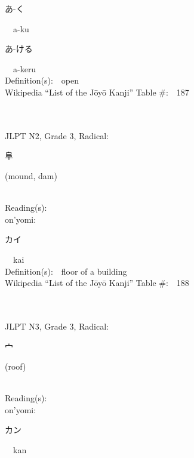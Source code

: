 \begin{multicols}{2}
{\hspace*{2em}}{\begin{CJK}{UTF8}{min} あ-く \end{CJK}}\ \ a-ku\ \ \\
{\hspace*{2em}}{\begin{CJK}{UTF8}{min} あ-ける \end{CJK}}\ \ a-keru\ \ \\
Definition(s):\ \ open \\
Wikipedia ``List of the J\=oy\=o Kanji'' Table \#:\ \ 187 \\
\ \ \\
{\fontsize{34pt}{40pt}  }\ \ \\  %
{JLPT N2, Grade 3, Radical:\ \ {\begin{CJK}{UTF8}{min} 阜 \end{CJK}} (mound, dam) } \\
Reading(s):\ \ \\
{\hspace*{1em}}on'yomi:\ \ \\
{\hspace*{2em}}{\begin{CJK}{UTF8}{min} カイ \end{CJK}}\ \ kai\ \ \\
Definition(s):\ \ floor of a building \\
Wikipedia ``List of the J\=oy\=o Kanji'' Table \#:\ \ 188 \\
\ \ \\
{\fontsize{34pt}{40pt}  }\ \ \\  %
{JLPT N3, Grade 3, Radical:\ \ {\begin{CJK}{UTF8}{min} 宀 \end{CJK}} (roof) } \\
Reading(s):\ \ \\
{\hspace*{1em}}on'yomi:\ \ \\
{\hspace*{2em}}{\begin{CJK}{UTF8}{min} カン \end{CJK}}\ \ kan\ \ \\

\end{multicols}
